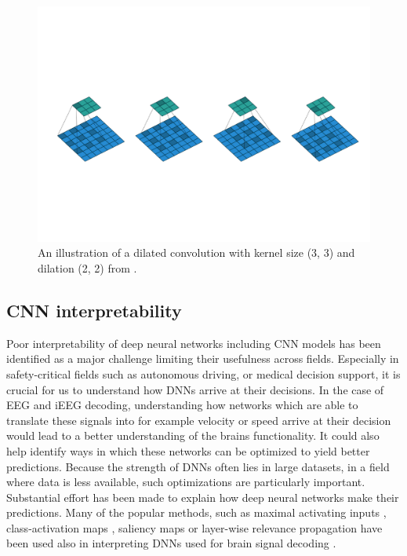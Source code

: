 \begin{figure}[!htpb]
\centering
   \includegraphics[width=0.8\linewidth]{img/ch3/dilated-conv.pdf}
   \caption[Dilated convolution]{An illustration of a dilated convolution with kernel size (3, 3) and dilation (2, 2) from \cite{dilated-conv}.}
\end{figure}\label{fig:dilation}


\subsection{CNN interpretability}
Poor interpretability of deep neural networks including CNN models has been identified as a major challenge limiting their usefulness across fields. 
Especially in safety-critical fields such as autonomous driving, or medical decision support, it is crucial for us to understand how DNNs arrive at their decisions.
In the case of EEG and iEEG decoding, understanding how networks which are able to translate these signals into for example velocity or speed arrive at their decision would lead to a better understanding of the brains functionality. 
It could also help identify ways in which these networks can be optimized to yield better predictions.
Because the strength of DNNs often lies in large datasets, in a field where data is less available, such optimizations are particularly important.\\

Substantial effort has been made to explain how deep neural networks make their predictions.
Many of the popular methods, such as maximal activating inputs \cite{maximizing-activation}, class-activation maps \cite{class-activation-maps}, saliency maps \cite{gradient-visualization} or layer-wise relevance propagation \cite{sturm-interpretable-2016} have been used also in interpreting DNNs used for brain signal decoding \cite{goodfellow-towards-2018, hartmann-hierarchical-2018, rieke-visualizing-2018, yang-visual-2018,  sturm-interpretable-2016, }.

